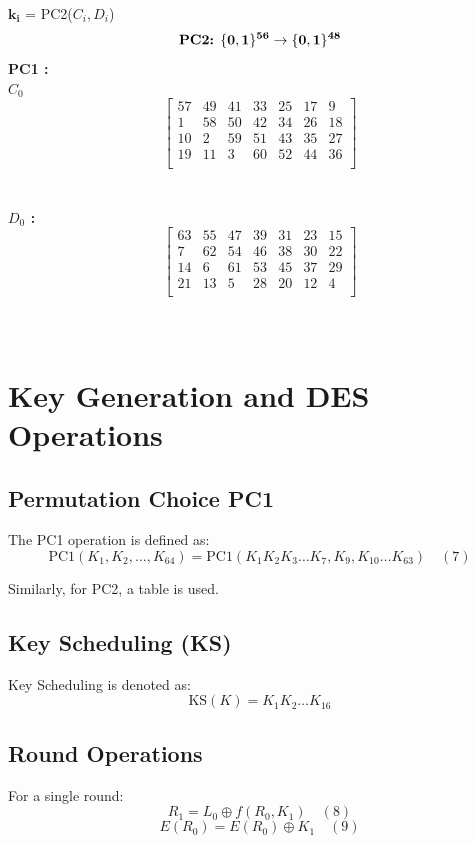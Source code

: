 \documentclass[11pt]{article}
\begin{document}
\textbf{\(\bm{k_i}\)} = PC2($C_i, D_i$)
\\
\begin{equation}
\text{\textbf{PC2:} } \mathbf{\{ 0, 1 \}^{56} \rightarrow \{ 0, 1 \}^{48}}    
\end{equation}
\textbf{PC1 :}\\
$C_0$ \\
\[
\begin{bmatrix}
    57 & 49 & 41 & 33 & 25 & 17 & 9 \\
    1 & 58 & 50 & 42 & 34 & 26 & 18 \\
    10 & 2 & 59 & 51 & 43 & 35 & 27 \\
    19 & 11 & 3 & 60 & 52 & 44 & 36 \\
\end{bmatrix}
\]
\\
\\
\textbf{$D_0$ :}\\
\[
\begin{bmatrix}
    63 & 55 & 47 & 39 & 31 & 23 & 15 \\
    7 & 62 & 54 & 46 & 38 & 30 & 22 \\
    14 & 6 & 61 & 53 & 45 & 37 & 29 \\
    21 & 13 & 5 & 28 & 20 & 12 & 4 \\
\end{bmatrix}
\]
\\
\\

\section*{Key Generation and DES Operations}

\subsection*{Permutation Choice PC1}
The PC1 operation is defined as:
\[ \text{PC1}(K_1, K_2, \ldots, K_{64}) = \text{PC1}(K_1 K_2 K_3 \ldots K_7, K_9, K_{10} \ldots K_{63}) \quad (7) \]

Similarly, for PC2, a table is used.

\subsection*{Key Scheduling (KS)}
Key Scheduling is denoted as:
\[ \text{KS}(K) = K_1 K_2 \ldots K_{16} \]

\subsection*{Round Operations}
For a single round:
\[ R_1 = L_0 \oplus f(R_0, K_1) \quad (8) \]
\[ E(R_0) = E(R_0) \oplus K_1 \quad (9) \]
\end{document}
